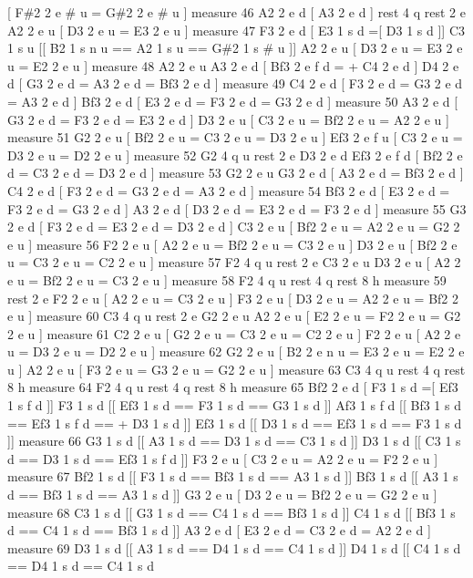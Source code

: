 \mbox{[} F\#2 2 e \# u = G\#2 2 e \# u \mbox{]} measure 46 A2 2 e d \mbox{[} A3 2 e d \mbox{]} rest 4 q rest 2 e A2 2 e u \mbox{[} D3 2 e u = E3 2 e u \mbox{]} measure 47 F3 2 e d \mbox{[} E3 1 s d =\mbox{[} D3 1 s d \mbox{]}\mbox{]} C3 1 s u \mbox{[}\mbox{[} B2 1 s n u == A2 1 s u == G\#2 1 s \# u \mbox{]}\mbox{]} A2 2 e u \mbox{[} D3 2 e u = E3 2 e u = E2 2 e u \mbox{]} measure 48 A2 2 e u A3 2 e d \mbox{[} Bf3 2 e f d = + C4 2 e d \mbox{]} D4 2 e d \mbox{[} G3 2 e d = A3 2 e d = Bf3 2 e d \mbox{]} measure 49 C4 2 e d \mbox{[} F3 2 e d = G3 2 e d = A3 2 e d \mbox{]} Bf3 2 e d \mbox{[} E3 2 e d = F3 2 e d = G3 2 e d \mbox{]} measure 50 A3 2 e d \mbox{[} G3 2 e d = F3 2 e d = E3 2 e d \mbox{]} D3 2 e u \mbox{[} C3 2 e u = Bf2 2 e u = A2 2 e u \mbox{]} measure 51 G2 2 e u \mbox{[} Bf2 2 e u = C3 2 e u = D3 2 e u \mbox{]} Ef3 2 e f u \mbox{[} C3 2 e u = D3 2 e u = D2 2 e u \mbox{]} measure 52 G2 4 q u rest 2 e D3 2 e d Ef3 2 e f d \mbox{[} Bf2 2 e d = C3 2 e d = D3 2 e d \mbox{]} measure 53 G2 2 e u G3 2 e d \mbox{[} A3 2 e d = Bf3 2 e d \mbox{]} C4 2 e d \mbox{[} F3 2 e d = G3 2 e d = A3 2 e d \mbox{]} measure 54 Bf3 2 e d \mbox{[} E3 2 e d = F3 2 e d = G3 2 e d \mbox{]} A3 2 e d \mbox{[} D3 2 e d = E3 2 e d = F3 2 e d \mbox{]} measure 55 G3 2 e d \mbox{[} F3 2 e d = E3 2 e d = D3 2 e d \mbox{]} C3 2 e u \mbox{[} Bf2 2 e u = A2 2 e u = G2 2 e u \mbox{]} measure 56 F2 2 e u \mbox{[} A2 2 e u = Bf2 2 e u = C3 2 e u \mbox{]} D3 2 e u \mbox{[} Bf2 2 e u = C3 2 e u = C2 2 e u \mbox{]} measure 57 F2 4 q u rest 2 e C3 2 e u D3 2 e u \mbox{[} A2 2 e u = Bf2 2 e u = C3 2 e u \mbox{]} measure 58 F2 4 q u rest 4 q rest 8 h measure 59 rest 2 e F2 2 e u \mbox{[} A2 2 e u = C3 2 e u \mbox{]} F3 2 e u \mbox{[} D3 2 e u = A2 2 e u = Bf2 2 e u \mbox{]} measure 60 C3 4 q u rest 2 e G2 2 e u A2 2 e u \mbox{[} E2 2 e u = F2 2 e u = G2 2 e u \mbox{]} measure 61 C2 2 e u \mbox{[} G2 2 e u = C3 2 e u = C2 2 e u \mbox{]} F2 2 e u \mbox{[} A2 2 e u = D3 2 e u = D2 2 e u \mbox{]} measure 62 G2 2 e u \mbox{[} B2 2 e n u = E3 2 e u = E2 2 e u \mbox{]} A2 2 e u \mbox{[} F3 2 e u = G3 2 e u = G2 2 e u \mbox{]} measure 63 C3 4 q u rest 4 q rest 8 h measure 64 F2 4 q u rest 4 q rest 8 h measure 65 Bf2 2 e d \mbox{[} F3 1 s d =\mbox{[} Ef3 1 s f d \mbox{]}\mbox{]} F3 1 s d \mbox{[}\mbox{[} Ef3 1 s d == F3 1 s d == G3 1 s d \mbox{]}\mbox{]} Af3 1 s f d \mbox{[}\mbox{[} Bf3 1 s d == Ef3 1 s f d == + D3 1 s d \mbox{]}\mbox{]} Ef3 1 s d \mbox{[}\mbox{[} D3 1 s d == Ef3 1 s d == F3 1 s d \mbox{]}\mbox{]} measure 66 G3 1 s d \mbox{[}\mbox{[} A3 1 s d == D3 1 s d == C3 1 s d \mbox{]}\mbox{]} D3 1 s d \mbox{[}\mbox{[} C3 1 s d == D3 1 s d == Ef3 1 s f d \mbox{]}\mbox{]} F3 2 e u \mbox{[} C3 2 e u = A2 2 e u = F2 2 e u \mbox{]} measure 67 Bf2 1 s d \mbox{[}\mbox{[} F3 1 s d == Bf3 1 s d == A3 1 s d \mbox{]}\mbox{]} Bf3 1 s d \mbox{[}\mbox{[} A3 1 s d == Bf3 1 s d == A3 1 s d \mbox{]}\mbox{]} G3 2 e u \mbox{[} D3 2 e u = Bf2 2 e u = G2 2 e u \mbox{]} measure 68 C3 1 s d \mbox{[}\mbox{[} G3 1 s d == C4 1 s d == Bf3 1 s d \mbox{]}\mbox{]} C4 1 s d \mbox{[}\mbox{[} Bf3 1 s d == C4 1 s d == Bf3 1 s d \mbox{]}\mbox{]} A3 2 e d \mbox{[} E3 2 e d = C3 2 e d = A2 2 e d \mbox{]} measure 69 D3 1 s d \mbox{[}\mbox{[} A3 1 s d == D4 1 s d == C4 1 s d \mbox{]}\mbox{]} D4 1 s d \mbox{[}\mbox{[} C4 1 s d == D4 1 s d == C4 1 s d 